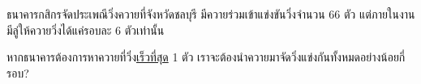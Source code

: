 \question{}

ธนาคารกสิกรจัดประเพณีวิ่งควายที่จังหวัดชลบุรี มีควายร่วมเข้าแข่งขันวิ่งจำนวน 66 ตัว 
แต่ภายในงานมีลู่ให้ควายวิ่งได้แค่รอบละ 6 ตัวเท่านั้น

หากธนาคารต้องการหาควายที่วิ่ง\uline{เร็วที่สุด} 1 ตัว 
เราจะต้องนำควายมาจัดวิ่งแข่งกันทั้งหมดอย่างน้อยกี่รอบ?\hrsp%
